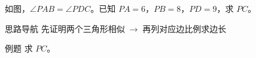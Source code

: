 \documentclass{exam-zh}
\begin{document}

\begin{eduProblemBlock}[例题]
\noindent
\begin{minipage}[t]{\dimexpr\linewidth-70mm-6mm\relax}
\vspace{0pt}
如图，$\angle PAB=\angle PDC$。已知 $PA=6$，$PB=8$，$PD=9$，求 $PC$。

\end{minipage}\hfill
\begin{diagramcoltikz}{70mm}{先沿两个角的顶点顺序，找出两个三角形的对应顶点。}
}
\end{diagramcoltikz}
\end{eduProblemBlock}





\begin{eduAuxItem}{思路导航}
先证明两个三角形相似$\;\to\;$再列对应边比例求边长\end{eduAuxItem}




\begin{eduSubQuestionItem}{例题}
求 $PC$。\end{eduSubQuestionItem}

\begin{eduDualExplain}
  \begin{eduExplainLeft}
  \end{eduExplainLeft}

  \begin{eduExplainRight}
  \end{eduExplainRight}
\end{eduDualExplain}
\end{document}
